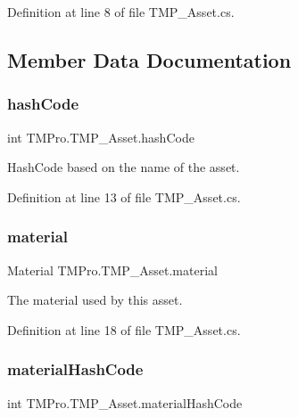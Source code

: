 Definition at line 8 of file T\+M\+P\+\_\+\+Asset.\+cs.



\subsection{Member Data Documentation}
\mbox{\label{class_t_m_pro_1_1_t_m_p___asset_a63f177ff7028859d2b431789737d8ccc}} 
\subsubsection{\texorpdfstring{hashCode}{hashCode}}
{\footnotesize\ttfamily int T\+M\+Pro.\+T\+M\+P\+\_\+\+Asset.\+hash\+Code}



Hash\+Code based on the name of the asset. 



Definition at line 13 of file T\+M\+P\+\_\+\+Asset.\+cs.

\mbox{\label{class_t_m_pro_1_1_t_m_p___asset_a8dcd405969e8c3aaa441c0fe3b0b6eaa}} 
\subsubsection{\texorpdfstring{material}{material}}
{\footnotesize\ttfamily Material T\+M\+Pro.\+T\+M\+P\+\_\+\+Asset.\+material}



The material used by this asset. 



Definition at line 18 of file T\+M\+P\+\_\+\+Asset.\+cs.

\mbox{\label{class_t_m_pro_1_1_t_m_p___asset_a55abe9aef1cf6d3e49fec1257abd152c}} 
\subsubsection{\texorpdfstring{materialHashCode}{materialHashCode}}
{\footnotesize\ttfamily int T\+M\+Pro.\+T\+M\+P\+\_\+\+Asset.\+material\+Hash\+Code}



